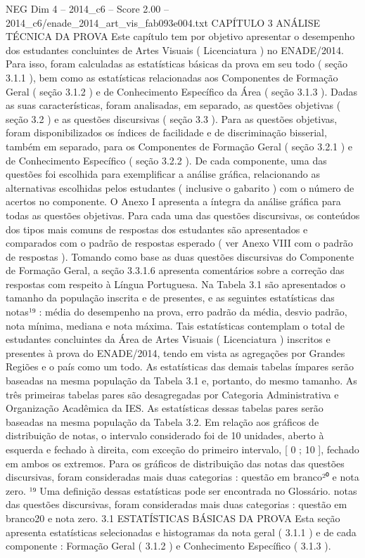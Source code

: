 \begin{textsample}{NEG Dim 4 – 2014\_c6 – Score 2.00 – 2014\_c6/enade\_2014\_art\_vis\_fab093e004.txt}  \label{ex:f4_neg_282}
CAPÍTULO 3 ANÁLISE TÉCNICA DA PROVA Este capítulo tem por objetivo apresentar o desempenho dos estudantes concluintes de Artes Visuais ( Licenciatura ) no ENADE/2014.
Para isso, foram calculadas as estatísticas básicas da prova em seu todo ( seção 3.1.1 ), bem como as estatísticas relacionadas aos Componentes de Formação Geral ( seção 3.1.2 ) e de Conhecimento Específico da Área ( seção 3.1.3 ).
Dadas as suas características, foram analisadas, em separado, as questões objetivas ( seção 3.2 ) e as questões discursivas ( seção 3.3 ).
Para as questões objetivas, foram disponibilizados os índices de facilidade e de discriminação bisserial, também em separado, para os Componentes de Formação Geral ( seção 3.2.1 ) e de Conhecimento Específico ( seção 3.2.2 ).
De cada componente, uma das questões foi escolhida para exemplificar a análise gráfica, relacionando as alternativas escolhidas pelos estudantes ( inclusive o gabarito ) com o número de acertos no componente.
O Anexo I apresenta a íntegra da análise gráfica para todas as questões objetivas.
Para cada uma das questões discursivas, os conteúdos dos tipos mais comuns de respostas dos estudantes são apresentados e comparados com o padrão de respostas esperado ( ver Anexo VIII com o padrão de respostas ).
Tomando como base as duas questões discursivas do Componente de Formação Geral, a seção 3.3.1.6 apresenta comentários sobre a correção das respostas com respeito à Língua Portuguesa.
Na Tabela 3.1 são apresentados o tamanho da população inscrita e de presentes, e as seguintes estatísticas das notas¹⁹ : média do desempenho na prova, erro padrão da média, desvio padrão, nota mínima, mediana e nota máxima.
Tais estatísticas contemplam o total de estudantes concluintes da Área de Artes Visuais ( Licenciatura ) inscritos e presentes à prova do ENADE/2014, tendo em vista as agregações por Grandes Regiões e o país como um todo.
As estatísticas das demais tabelas ímpares serão baseadas na mesma população da Tabela 3.1 e, portanto, do mesmo tamanho.
As três primeiras tabelas pares são desagregadas por Categoria Administrativa e Organização Acadêmica da IES.
As estatísticas dessas tabelas pares serão baseadas na mesma população da Tabela 3.2.
Em relação aos gráficos de distribuição de notas, o intervalo considerado foi de 10 unidades, aberto à esquerda e fechado à direita, com exceção do primeiro intervalo, [ 0 ; 10 ], fechado em ambos os extremos.
Para os gráficos de distribuição das notas das questões discursivas, foram consideradas mais duas categorias : questão em branco²⁰ e nota zero. ¹⁹ Uma definição dessas estatísticas pode ser encontrada no Glossário. notas das questões discursivas, foram consideradas mais duas categorias : questão em branco20 e nota zero. 3.1 ESTATÍSTICAS BÁSICAS DA PROVA Esta seção apresenta estatísticas selecionadas e histogramas da nota geral ( 3.1.1 ) e de cada componente : Formação Geral ( 3.1.2 ) e Conhecimento Específico ( 3.1.3 ).

\end{textsample}
